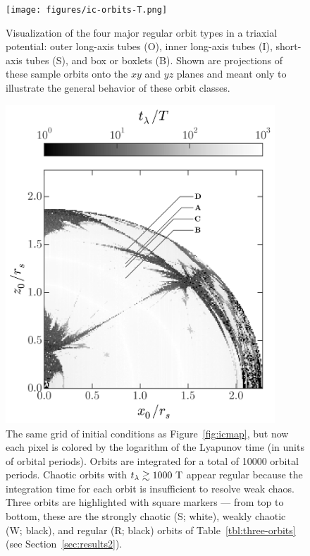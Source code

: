 \documentclass[letterpaper,12pt,preprint]{aastex}
\newcommand{\periods}{\ensuremath{{\rm T}}}
\begin{document}
\begin{figure}[p]
\begin{center}
\texttt{[image: figures/ic-orbits-T.png]}
\caption{ Visualization of the four major regular orbit types in a triaxial potential: outer long-axis tubes (O), inner long-axis tubes (I), short-axis tubes (S), and box or boxlets (B). Shown are projections of these sample orbits onto the $xy$ and $yz$ planes and meant only to illustrate the general behavior of these orbit classes.} \label{fig:icorbits} 
\end{center}
\end{figure}

\begin{figure}[p]
\begin{center}
\includegraphics[width=0.9\textwidth, trim={0 1cm 0 0}]{figures/lyap_map.png}
\caption{ The same grid of initial conditions as Figure~\ref{fig:icmap}, but now each pixel is colored by the  logarithm of the Lyapunov time (in units of orbital periods). Orbits are integrated for a total of 10000 orbital periods. Chaotic orbits with $t_\lambda \gtrsim 1000~\periods$ appear regular because the integration time for each orbit is insufficient to resolve weak chaos. Three orbits are highlighted with square markers --- from top to bottom, these are the strongly chaotic (S; white), weakly chaotic (W; black), and regular (R; black) orbits of Table~\ref{tbl:three-orbits} (see Section~\ref{sec:results2}).} \label{fig:lyapmap} 
\end{center}
\end{figure}
\end{document}
